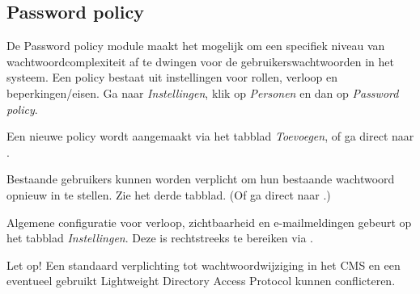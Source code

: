 \subsection{Password policy}\label{passwordpolicy}

De Password policy module maakt het mogelijk om een specifiek niveau van wachtwoordcomplexiteit af te dwingen voor de gebruikerswachtwoorden in het systeem. Een policy bestaat uit instellingen voor rollen, verloop en beperkingen/eisen. Ga naar \emph{Instellingen}, klik op \emph{Personen} en dan op \emph{Password policy}.

Een nieuwe policy wordt aangemaakt via het tabblad \emph{Toevoegen}, of ga direct naar .

Bestaande gebruikers kunnen worden verplicht om hun bestaande wachtwoord opnieuw in te stellen. Zie het derde tabblad. (Of ga direct naar .)

Algemene configuratie voor verloop, zichtbaarheid en e-mailmeldingen gebeurt op het tabblad \emph{Instellingen}. Deze is rechtstreeks te bereiken via .

Let op! Een standaard verplichting tot wachtwoordwijziging in het CMS en een eventueel gebruikt Lightweight Directory Access Protocol kunnen conflicteren.